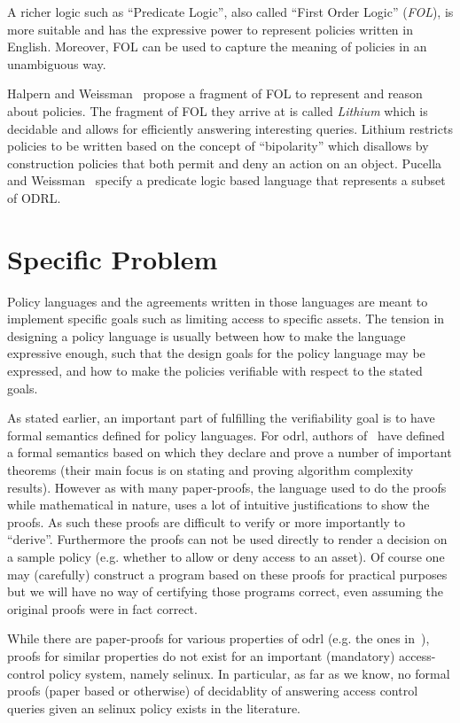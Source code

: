 A richer logic such as ``Predicate Logic'', also called ``First Order Logic'' (\emph{FOL}), is more suitable and has the expressive power to represent policies written in English. Moreover, FOL can be used to capture the meaning of policies in an unambiguous way.

Halpern and Weissman~\cite{Halpern2008} propose a fragment of FOL to represent and reason about policies. The fragment of FOL they arrive at is called \emph{Lithium} which is decidable and allows for efficiently answering interesting queries. Lithium restricts policies to be written based on the concept of ``bipolarity'' which disallows by construction policies that both permit and deny an action on an object. Pucella and Weissman~\cite{pucella2006} specify a predicate logic based language that represents a subset of ODRL.


\section{Specific Problem}

Policy languages and the agreements written in those languages are meant to implement specific goals such as limiting access to specific assets. The tension in designing a policy language is usually between how to make the language expressive enough, such that the design goals for the policy language may be expressed, and how to make the policies verifiable with respect to the stated goals.

As stated earlier, an important part of fulfilling the verifiability goal is to have formal semantics defined for policy languages. For \ac{odrl}, authors of~\cite{pucella2006} have defined a formal semantics based on which they declare and prove a number of important theorems (their main focus is on stating and proving algorithm complexity results). However as with many paper-proofs, the language used to do the proofs while mathematical in nature, uses a lot of intuitive justifications to show the proofs. As such these proofs are difficult to verify or more importantly to ``derive''. Furthermore the proofs can not be used directly to render a decision on a sample policy (e.g. whether to allow or deny access to an asset). Of course one may (carefully) construct a program based on these proofs for practical purposes but we will have no way of certifying those programs correct, even assuming the original proofs were in fact correct.

While there are paper-proofs for various properties of \ac{odrl} (e.g. the ones in~\cite{pucella2006}), proofs for similar properties do not exist for an important (mandatory) access-control policy system, namely \ac{selinux}. In particular, as far as we know, no formal proofs (paper based or otherwise) of decidablity of answering access control queries given an \ac{selinux} policy exists in the literature. 


